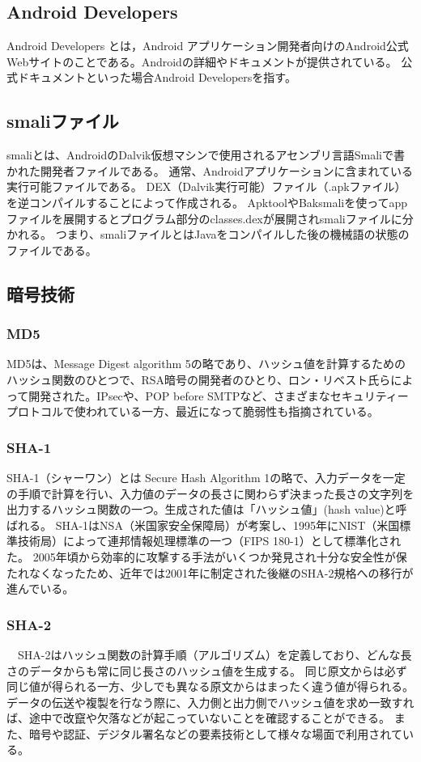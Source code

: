 \subsection{Android Developers}
Android Developers とは，Android アプリケーション開発者向けのAndroid公式Webサイトのことである。Androidの詳細やドキュメントが提供されている。
公式ドキュメントといった場合Android Developersを指す。

\subsection{smaliファイル}
 smaliとは、AndroidのDalvik仮想マシンで使用されるアセンブリ言語Smaliで書かれた開発者ファイルである。
通常、Androidアプリケーションに含まれている実行可能ファイルである。
DEX（Dalvik実行可能）ファイル（.apkファイル）を逆コンパイルすることによって作成される。
ApktoolやBaksmaliを使ってappファイルを展開するとプログラム部分のclasses.dexが展開されsmaliファイルに分かれる。
つまり、smaliファイルとはJavaをコンパイルした後の機械語の状態のファイルである。

\subsection{暗号技術}

\subsubsection {MD5}
MD5は、Message Digest algorithm 5の略であり、ハッシュ値を計算するためのハッシュ関数のひとつで、RSA暗号の開発者のひとり、ロン・リベスト氏らによって開発された。IPsecや、POP before SMTPなど、さまざまなセキュリティープロトコルで使われている一方、最近になって脆弱性も指摘されている。

\subsubsection {SHA-1}
SHA-1（シャーワン）とは Secure Hash Algorithm 1の略で、入力データを一定の手順で計算を行い、入力値のデータの長さに関わらず決まった長さの文字列を出力するハッシュ関数の一つ。生成された値は「ハッシュ値」(hash value)と呼ばれる。
SHA-1はNSA（米国家安全保障局）が考案し、1995年にNIST（米国標準技術局）によって連邦情報処理標準の一つ（FIPS 180-1）として標準化された。
2005年頃から効率的に攻撃する手法がいくつか発見され十分な安全性が保たれなくなったため、近年では2001年に制定された後継のSHA-2規格への移行が進んでいる。

\subsubsection{SHA-2}
　SHA-2はハッシュ関数の計算手順（アルゴリズム）を定義しており、どんな長さのデータからも常に同じ長さのハッシュ値を生成する。
同じ原文からは必ず同じ値が得られる一方、少しでも異なる原文からはまったく違う値が得られる。
データの伝送や複製を行なう際に、入力側と出力側でハッシュ値を求め一致すれば、途中で改竄や欠落などが起こっていないことを確認することができる。
また、暗号や認証、デジタル署名などの要素技術として様々な場面で利用されている。　


